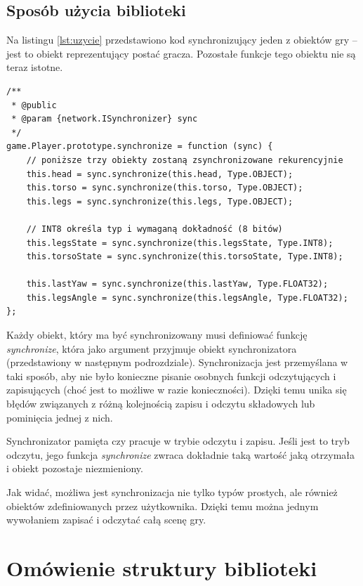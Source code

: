\subsection{Sposób użycia biblioteki}

Na listingu \ref{lst:uzycie} przedstawiono kod synchronizujący jeden z obiektów gry -- jest
to obiekt reprezentujący postać gracza. Pozostałe funkcje tego obiektu nie są teraz istotne.

\begin{lstlisting}[label=lst:uzycie,caption=Kod synchronizujący jeden z obiektów gry]
/**
 * @public
 * @param {network.ISynchronizer} sync
 */
game.Player.prototype.synchronize = function (sync) {
    // poniższe trzy obiekty zostaną zsynchronizowane rekurencyjnie
    this.head = sync.synchronize(this.head, Type.OBJECT);
    this.torso = sync.synchronize(this.torso, Type.OBJECT);
    this.legs = sync.synchronize(this.legs, Type.OBJECT);

    // INT8 określa typ i wymaganą dokładność (8 bitów)
    this.legsState = sync.synchronize(this.legsState, Type.INT8);
    this.torsoState = sync.synchronize(this.torsoState, Type.INT8);

    this.lastYaw = sync.synchronize(this.lastYaw, Type.FLOAT32);
    this.legsAngle = sync.synchronize(this.legsAngle, Type.FLOAT32);
};
\end{lstlisting}

Każdy obiekt, który ma być synchronizowany musi definiować funkcję \emph{synchronize}, która jako
argument przyjmuje obiekt synchronizatora (przedstawiony w następnym podrozdziale). Synchronizacja jest
przemyślana w taki sposób, aby nie było konieczne pisanie osobnych funkcji odczytujących i zapisujących
(choć jest to możliwe w razie konieczności).
Dzięki temu unika się błędów związanych z różną kolejnością zapisu i odczytu składowych lub pominięcia
jednej z nich.

Synchronizator pamięta czy pracuje w trybie odczytu i zapisu. Jeśli jest to tryb odczytu,
jego funkcja \emph{synchronize} zwraca dokładnie taką wartość jaką otrzymała i obiekt pozostaje niezmieniony.

Jak widać, możliwa jest synchronizacja nie tylko typów prostych, ale również obiektów zdefiniowanych
przez użytkownika. Dzięki temu można jednym wywołaniem zapisać i odczytać całą scenę gry.

\section{Omówienie struktury biblioteki}

